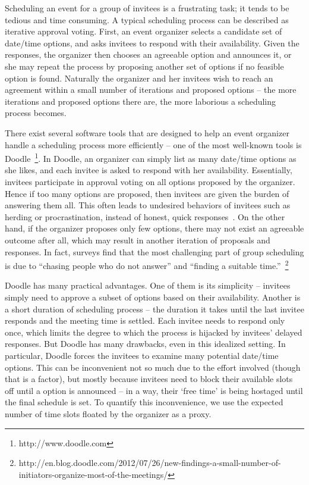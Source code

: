 \label{bdoodle:chapter}

Scheduling an event for a group of invitees is a frustrating task; it tends to be tedious and time consuming.
A typical scheduling process can be described as iterative approval voting.
First, an event organizer selects a candidate set of date/time options, and asks invitees to respond with their availability. 
Given the responses, the organizer then chooses an agreeable option and announces it, or she may repeat the process by proposing another set of options if no feasible option is found. 
Naturally the organizer and her invitees wish to reach an agreement within a small number of iterations and proposed options -- the more iterations and proposed options there are, the more laborious a scheduling process becomes. 

There exist several software tools that are designed to help an event organizer handle a scheduling process more efficiently -- one of the most well-known tools is Doodle~\footnote{http://www.doodle.com}. 
In Doodle, an organizer can simply list as many date/time options as she likes, 
and each invitee is asked to respond with her availability. 
Essentially, invitees participate in approval voting on all options proposed by the organizer.
Hence if too many options are proposed, then invitees are given the burden of answering them all. 
This often leads to undesired behaviors of invitees such as herding or procrastination, instead of honest, quick responses~\cite{zou2015strategic}. 
On the other hand, if the organizer proposes only few options, there may not exist an agreeable outcome after all, which may result in another iteration of proposals and responses. 
In fact, surveys find that the most challenging part of group scheduling is due to ``chasing people who do not answer'' and ``finding a suitable time.''~\footnote{http://en.blog.doodle.com/2012/07/26/new-findings-a-small-number-of-initiators-organize-most-of-the-meetings/}

Doodle has many practical advantages. 
One of them is its simplicity -- invitees simply need to approve a subset of options based on their availability.
Another is a short duration of scheduling process -- the duration it takes until
the last invitee responds and the meeting time is settled. Each invitee
needs to respond only once, which limits the degree to which the
process is hijacked by invitees' delayed responses. But Doodle has many
drawbacks, even in this idealized setting. In particular, Doodle
forces the invitees to examine many potential date/time options. This can be
inconvenient not so much due to the effort involved (though that is a
factor), but mostly because invitees need to block their available slots
off until a option is announced -- in a way, their `free time' is being hostaged until the final schedule is set.
To quantify this inconvenience, we use the expected number of time
slots floated by the organizer as a proxy.

